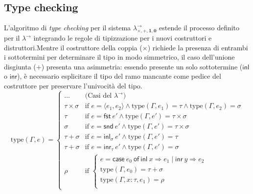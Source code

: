 \subsection{Type checking}
L'algoritmo di \emph{type checking} per il sistema $\lambda^{\to}_{\times, +, \mathbf{1}, \mathbf{0}}$ estende il processo definito per il $\lambda^{\to}$ integrando 
le regole di tipizzazione per i nuovi costruttori e distruttori.Mentre il costruttore della coppia ($\times$) richiede la presenza di entrambi i sottotermini per 
determinare il tipo in modo simmetrico, il caso dell'unione disgiunta ($+$) presenta una asimmetria: essendo presente un solo sottotermine ($\mathsf{inl}$ o $\mathsf{inr}$), 
è necessario esplicitare il tipo del ramo mancante come pedice del costruttore per preservare l'univocità del tipo.
\begin{equation}
    \text{type}(\Gamma, e) = 
    \begin{cases} 
        \dots               & \text{(Casi del $\lambda^{\to}$)}                                                                                     \\
        \tau \times \sigma  & \text{if } e = \langle e_1, e_2 \rangle \land \text{type}(\Gamma, e_1) = \tau \land \text{type}(\Gamma, e_2) = \sigma \\
        \tau                & \text{if } e = \mathsf{fst} \ e' \land \text{type}(\Gamma, e') = \tau \times \sigma                                   \\
        \sigma              & \text{if } e = \mathsf{snd} \ e' \land \text{type}(\Gamma, e') = \tau \times \sigma                                   \\
        \tau + \sigma       & \text{if } e = \mathsf{inl}_{\sigma} \ e' \land \text{type}(\Gamma, e') = \tau                                        \\
        \tau + \sigma       & \text{if } e = \mathsf{inr}_{\tau} \ e' \land \text{type}(\Gamma, e') = \sigma                                        \\
        \rho                & \text{if } 
            \begin{cases} 
                e = \mathsf{case} \ e_0 \ \mathsf{of} \ \mathsf{inl} \ x \Rightarrow e_1 \mid \mathsf{inr} \ y \Rightarrow e_2  \\
                \text{type}(\Gamma, e_0) = \tau + \sigma                                                                        \\
                \text{type}(\Gamma, x:\tau, e_1) = \rho                                                                         \\

\end{cases}
\end{cases}
\end{equation}
